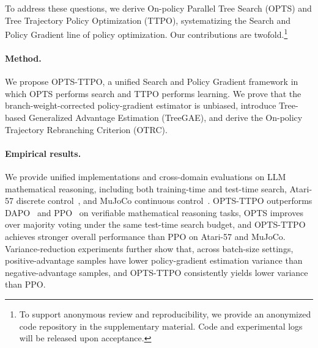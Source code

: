 To address these questions, we derive On-policy Parallel Tree Search (OPTS) and Tree Trajectory Policy Optimization (TTPO), systematizing the Search and Policy Gradient line of policy optimization. Our contributions are twofold.\footnote{To support anonymous review and reproducibility, we provide an anonymized code repository in the supplementary material. Code and experimental logs will be released upon acceptance.}

\paragraph{Method.} We propose OPTS-TTPO, a unified Search and Policy Gradient framework in which OPTS performs search and TTPO performs learning. We prove that the branch-weight-corrected policy-gradient estimator is unbiased, introduce Tree-based Generalized Advantage Estimation (TreeGAE), and derive the On-policy Trajectory Rebranching Criterion (OTRC).
\paragraph{Empirical results.} We provide unified implementations and cross-domain evaluations on LLM mathematical reasoning, including both training-time and test-time search, Atari-57 discrete control~\citep{ref_atari}, and MuJoCo continuous control~\citep{ref_mujoco}. OPTS-TTPO outperforms DAPO~\citep{ref_dapo} and PPO~\citep{ref_ppo} on verifiable mathematical reasoning tasks, OPTS improves over majority voting under the same test-time search budget, and OPTS-TTPO achieves stronger overall performance than PPO on Atari-57 and MuJoCo. Variance-reduction experiments further show that, across batch-size settings, positive-advantage samples have lower policy-gradient estimation variance than negative-advantage samples, and OPTS-TTPO consistently yields lower variance than PPO.
